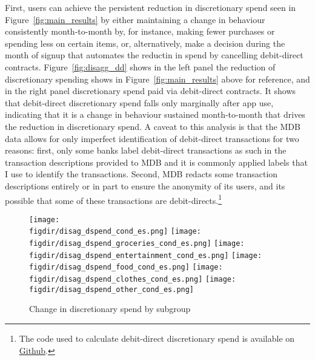 First, users can achieve the persistent reduction in discretionary
spend seen in Figure~\ref{fig:main_results} by either maintaining a change in
behaviour consistently month-to-month by, for instance, making fewer purchases
or spending less on certain items, or, alternatively, make a decision during
the month of signup that automates the reductin in spend by cancelling
debit-direct contracts. Figure~\ref{fig:disagg_dd} shows in the left panel the
reduction of discretionary spending shows in Figure~\ref{fig:main_results}
above for reference, and in the right panel discretionary spend paid via
debit-direct contracts. It shows that debit-direct discretionary spend falls
only marginally after app use, indicating that it is a change in behaviour
sustained month-to-month that drives the reduction in discretionary spend. A
caveat to this analysis is that the MDB data allows for only imperfect
identification of debit-direct transactions for two reasons: first, only some
banks label debit-direct transactions as such in the transaction descriptions
provided to MDB and it is commonly applied labels that I use to identify the
transactions. Second, MDB redacts some transaction descriptions entirely or in
part to ensure the anonymity of its users, and its possible that some of these
transactions are debit-directs.\footnote{The code used to calculate
debit-direct discretionary spend is available on
\href{https://github.com/fabiangunzinger/mdb_eval/blob/f31bfcd7a330188cdd27968d41957ebf5b454099/src/data/aggregators.py\#L461}{Github}.}

\begin{figure}[h]
    \centering
    \caption{Change in discretionary spend by subgroup}%
    \label{fig:disagg_groups}
    \texttt{[image: \\figdir/disag\_dspend\_cond\_es.png]}
    \texttt{[image: \\figdir/disag\_dspend\_groceries\_cond\_es.png]}
    \texttt{[image: \\figdir/disag\_dspend\_entertainment\_cond\_es.png]}
    \texttt{[image: \\figdir/disag\_dspend\_food\_cond\_es.png]}
    \texttt{[image: \\figdir/disag\_dspend\_clothes\_cond\_es.png]}
    \texttt{[image: \\figdir/disag\_dspend\_other\_cond\_es.png]}
\end{figure}

